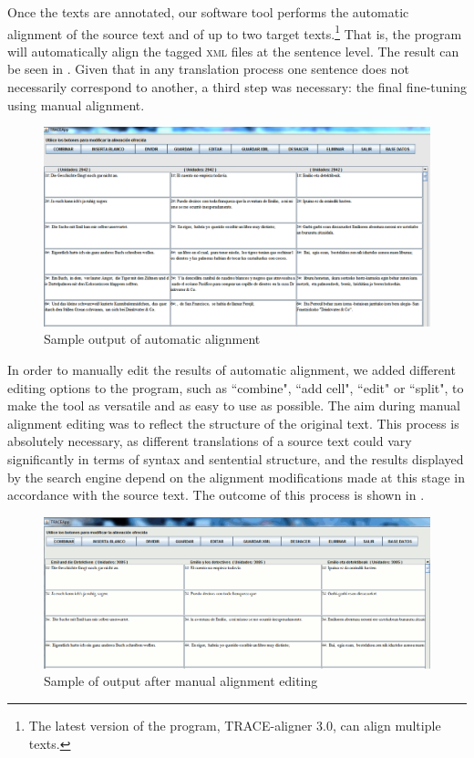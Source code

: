 \documentclass[output=paper]{LSP/langsci}
\begin{document}
Once the texts are annotated, our software tool performs the automatic alignment of the source text and of up to two target texts.\footnote{The latest version of the program, TRACE-aligner 3.0, can align multiple texts.}  That is, the program will automatically align the tagged \textsc{xml} files at the sentence level. The result can be seen in . Given that in any translation process one sentence does not necessarily correspond to another, a third step was necessary: the final fine-tuning using manual alignment.

\begin{figure}[htp] 
\includegraphics[width=1.0\textwidth]{./figures/6-3.png}
\caption{Sample output of automatic alignment} \label{fig:3:3}
\end{figure}

In order to manually edit the results of automatic alignment, we added different editing options to the program, such as “combine", “add cell", “edit" or “split", to make the tool as versatile and as easy to use as possible. The aim during manual alignment editing was to reflect the structure of the original text. This process is absolutely necessary, as different translations of a source text could vary significantly in terms of syntax and sentential structure, and the results displayed by the search engine depend on the alignment modifications made at this stage in accordance with the source text. The outcome of this process is shown in .

\begin{figure}
\includegraphics[width=1.0\textwidth]{./figures/6-4.png}
\caption{Sample of output after manual alignment editing} \label{fig:3:4}
\end{figure}
\end{document}
